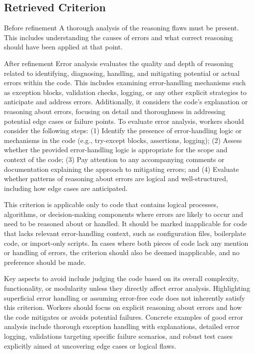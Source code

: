 \subsection{Retrieved Criterion}
\begin{tcolorbox}
    [title = {Criterion \textbf{error\_analysis}},breakable] Before refinement \tcblower
    \footnotesize A thorough analysis of the reasoning flaws must be present.
    This includes understanding the causes of errors and what correct reasoning
    should have been applied at that point.
\end{tcolorbox}
\begin{tcolorbox}
    [title = {Criterion \textbf{error\_analysis}},breakable] After refinement \tcblower
    \footnotesize Error analysis evaluates the quality and depth of reasoning related
    to identifying, diagnosing, handling, and mitigating potential or actual
    errors within the code. This includes examining error-handling mechanisms such
    as exception blocks, validation checks, logging, or any other explicit
    strategies to anticipate and address errors. Additionally, it considers the
    code's explanation or reasoning about errors, focusing on detail and thoroughness
    in addressing potential edge cases or failure points. To evaluate error
    analysis, workers should consider the following steps: (1) Identify the
    presence of error-handling logic or mechanisms in the code (e.g., try-except
    blocks, assertions, logging); (2) Assess whether the provided error-handling
    logic is appropriate for the scope and context of the code; (3) Pay
    attention to any accompanying comments or documentation explaining the
    approach to mitigating errors; and (4) Evaluate whether patterns of reasoning
    about errors are logical and well-structured, including how edge cases are
    anticipated.\par This criterion is applicable only to code that contains
    logical processes, algorithms, or decision-making components where errors
    are likely to occur and need to be reasoned about or handled. It should be marked
    inapplicable for code that lacks relevant error-handling context, such as
    configuration files, boilerplate code, or import-only scripts. In cases where
    both pieces of code lack any mention or handling of errors, the criterion
    should also be deemed inapplicable, and no preference should be made.\par Key
    aspects to avoid include judging the code based on its overall complexity,
    functionality, or modularity unless they directly affect error analysis.
    Highlighting superficial error handling or assuming error-free code does not
    inherently satisfy this criterion. Workers should focus on explicit reasoning
    about errors and how the code mitigates or avoids potential failures.
    Concrete examples of good error analysis include thorough exception handling
    with explanations, detailed error logging, validations targeting specific
    failure scenarios, and robust test cases explicitly aimed at uncovering edge
    cases or logical flaws.
\end{tcolorbox}


